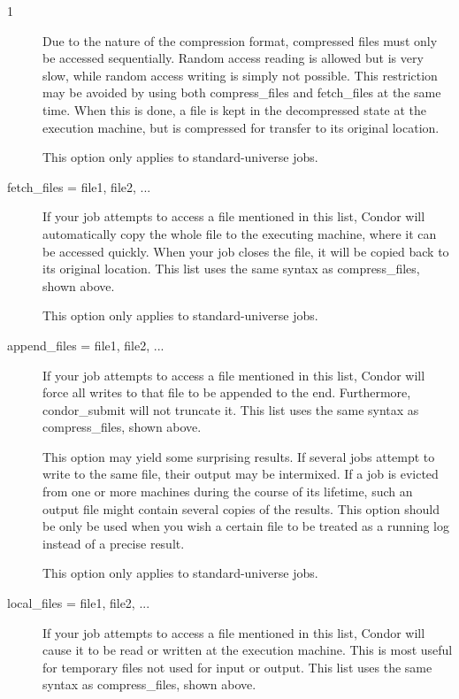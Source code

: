 \begin{ManPage}{\label{man-condor-submit}}{1}
\begin{description}
Due to the nature of the compression format, compressed files must only
be accessed sequentially.  Random access reading is allowed but is very slow,
while random access writing is simply not possible.  This restriction may be
avoided by using both compress\_files and fetch\_files at the same time.  When
this is done, a file is kept in the decompressed state at the execution
machine, but is compressed for transfer to its original location.

This option only applies to standard-universe jobs.


\item[fetch\_files = file1, file2, ...]

If your job attempts to access a file mentioned in this list,
Condor will automatically copy the whole file to the executing machine,
where it can be accessed quickly.  When your job closes the file,
it will be copied back to its original location.
This list uses the same syntax as compress\_files, shown above.

This option only applies to standard-universe jobs.


\item[append\_files = file1, file2, ...]

If your job attempts to access a file mentioned in this list,
Condor will force all writes to that file to be appended to the end.
Furthermore, condor\_submit will not truncate it.
This list uses the same syntax as compress\_files, shown above.

This option may yield some surprising results.  If several
jobs attempt to write to the same file, their output may be intermixed.
If a job is evicted from one or more machines during the course of its
lifetime, such an output file might contain several copies of the results.
This option should be only be used when you wish a certain file to be
treated as a running log instead of a precise result.

This option only applies to standard-universe jobs.


\item[local\_files = file1, file2, ...]

If your job attempts to access a file mentioned in this list,
Condor will cause it to be read or written at the execution machine.
This is most useful for temporary files not used for input or output.
This list uses the same syntax as compress\_files, shown above.


\end{description}
\end{ManPage}
